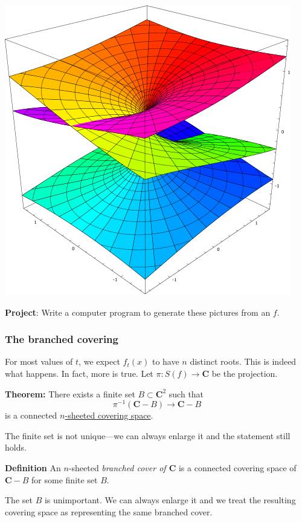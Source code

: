 \documentclass[11pt]{article}
\begin{document}
\begin{center}
\includegraphics[width=.9\linewidth]{assets/Course_notes/2023-03-24_14-34-56_473px-Riemann_surface_cube_root.svg.png}
\end{center}

\textbf{\textbf{Project}}: Write a computer program to generate these pictures from an \(f\).
\subsubsection{The branched covering}
\label{sec:org8eb48d5}

For most values of \(t\), we expect \(f_t(x)\) to have \(n\) distinct roots.
This is indeed what happens.
In fact, more is true.
Let \(\pi \colon S(f) \to \mathbf{C}\) be the projection.

\textbf{\textbf{Theorem:}} There exists a finite set \(B \subset \mathbf{C}^2\) such that 
\[ \pi^{-1}(\mathbf{C} -B) \to \mathbf{C}-B\]
is a connected \href{https://en.wikipedia.org/wiki/Covering\_space}{\(n\)-sheeted covering space}.

The finite set is not unique---we can always enlarge it and the statement still holds.

\textbf{\textbf{Definition}} An \(n\)-sheeted \emph{branched cover of \(\mathbf{C}\)} is a connected covering space of \(\mathbf{C} - B\) for some finite set \(B\).

The set \(B\) is unimportant.
We can always enlarge it and we treat the resulting covering space as representing the same branched cover.
\end{document}
